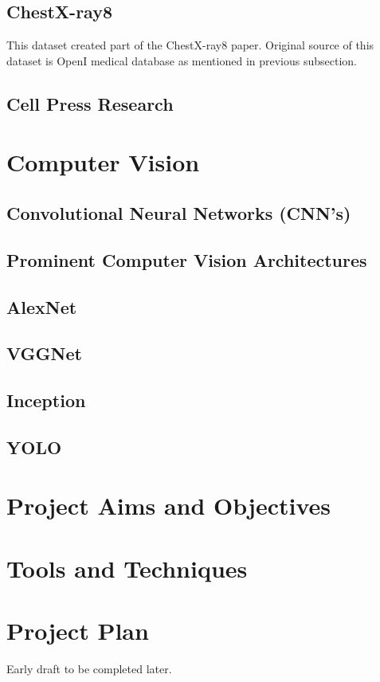 \documentclass[12pt, twoside, a4paper]{article}
\begin{document}
\subsection{ChestX-ray8}
This dataset created part of the ChestX-ray8\cite{ChestX-ray8} paper. Original source of this dataset is OpenI\cite{openi} medical database as mentioned in previous subsection.

\subsection{Cell Press Research}
\clearpage

\section{Computer Vision}
\subsection{Convolutional Neural Networks (CNN's)}
\subsection{Prominent Computer Vision Architectures}
\subsection{AlexNet}
\subsection{VGGNet}
\subsection{Inception}
\subsection{YOLO}
\clearpage

\section{Project Aims and Objectives}
\clearpage

\section{Tools and Techniques}
\clearpage

\section{Project Plan}
Early draft to be completed later.
\clearpage

\printbibliography
{}
\end{document}
